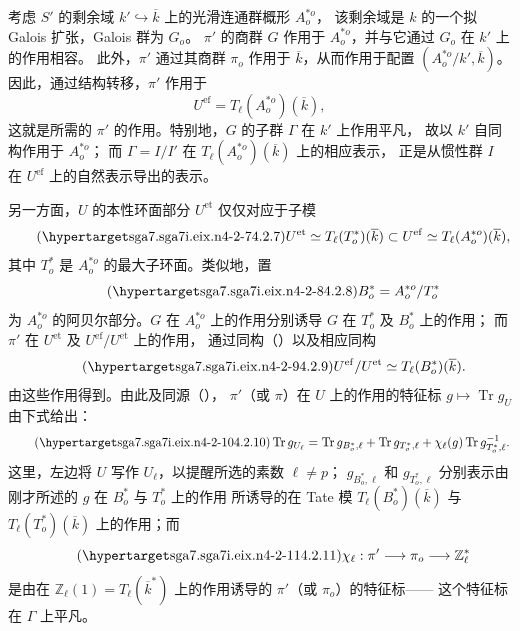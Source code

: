 考虑 $S'$ 的剩余域 $k'\hookrightarrow\overline k$ 上的光滑连通群概形 $A^{*o}_o$，
该剩余域是 $k$ 的一个拟 Galois 扩张，Galois 群为 $G_o$。
$\pi'$ 的商群 $G$ 作用于 $A^{*o}_o$，并与它通过 $G_o$ 在 $k'$ 上的作用相容。
此外，$\pi'$ 通过其商群 $\pi_o$ 作用于 $\overline k$，从而作用于配置
$(A^{*o}_o/k',\overline k)$。因此，通过结构转移，$\pi'$ 作用于
\[
 U^{\mathrm{ef}}=T_\ell(A^{*o}_o)(\overline k),
\]
这就是所需的 $\pi'$ 的作用。特别地，$G$ 的子群 $\Gamma$ 在 $k'$ 上作用平凡，
故以 $k'$ 自同构作用于 $A^{*o}_o$；
而 $\Gamma=I/I'$ 在 $T_\ell(A^{*o}_o)(\overline k)$ 上的相应表示，
正是从惯性群 $I$ 在 $U^{\mathrm{ef}}$ 上的自然表示导出的表示。

另一方面，$U$ 的本性环面部分 $U^{\mathrm{et}}$ 仅仅对应于子模
\begin{equation}\tag{\SGARefTarget{sga7.sga7i.eix.n4-2-7}{4.2.7}}
 U^{\mathrm{et}}\simeq T_\ell(T^*_o)(\overline k)
 \subset U^{\mathrm{ef}}\simeq T_\ell(A^{*o}_o)(\overline k),
\end{equation}
其中 $T^*_o$ 是 $A^{*o}_o$ 的最大子环面。类似地，置
\begin{equation}\tag{\SGARefTarget{sga7.sga7i.eix.n4-2-8}{4.2.8}}
 B^*_o=A^{*o}_o/T^*_o
\end{equation}
为 $A^{*o}_o$ 的阿贝尔部分。$G$ 在 $A^{*o}_o$ 上的作用分别诱导
$G$ 在 $T^*_o$ 及 $B^*_o$ 上的作用；
而 $\pi'$ 在 $U^{\mathrm{et}}$ 及 $U^{\mathrm{ef}}/U^{\mathrm{et}}$ 上的作用，
通过同构（）以及相应同构
\begin{equation}\tag{\SGARefTarget{sga7.sga7i.eix.n4-2-9}{4.2.9}}
 U^{\mathrm{ef}}/U^{\mathrm{et}}
 \simeq T_\ell(B^*_o)(\overline k).
\end{equation}
由这些作用得到。由此及同源（），
$\pi'$（或 $\pi$）在 $U$ 上的作用的特征标 $g\longmapsto\operatorname{Tr}g_U$ 由下式给出：
\begin{equation}\tag{\SGARefTarget{sga7.sga7i.eix.n4-2-10}{4.2.10}}
 \operatorname{Tr}g_{U_\ell}
 =\operatorname{Tr}g_{B^*_o,\ell}
 +\operatorname{Tr}g_{T^*_o,\ell}
 +\chi_\ell(g)\operatorname{Tr}g^{-1}_{T^*_o,\ell}.
\end{equation}
这里，左边将 $U$ 写作 $U_\ell$，以提醒所选的素数 $\ell\ne p$；
$g_{B^*_o,\ell}$ 和 $g_{T^*_o,\ell}$ 分别表示由刚才所述的 $g$ 在 $B^*_o$ 与 $T^*_o$ 上的作用
所诱导的在 Tate 模 $T_\ell(B^*_o)(\overline k)$ 与 $T_\ell(T^*_o)(\overline k)$ 上的作用；而
\begin{equation}\tag{\SGARefTarget{sga7.sga7i.eix.n4-2-11}{4.2.11}}
 \chi_\ell:\pi'\longrightarrow\pi_o\longrightarrow\mathbb Z_\ell^*
\end{equation}
是由在 $\mathbb Z_\ell(1)=T_\ell(\overline k^*)$ 上的作用诱导的 $\pi'$（或 $\pi_o$）的特征标——
这个特征标在 $\Gamma$ 上平凡。

